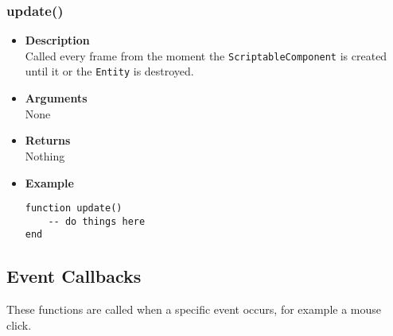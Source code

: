 \documentclass[12pt,a4paper]{article}
\begin{document}
\subsubsection{update()}
\begin{itemize}
	\item[]{\bf Description}
		\\ Called every frame from the moment the \texttt{ScriptableComponent} is created until it or the \texttt{Entity} is destroyed.
	\item[]{\bf Arguments}
		\\ None
	\item[]{\bf Returns}
		\\ Nothing
	\item[]{\bf Example}
\begin{lstlisting}[language={[5.0]Lua}]
function update()
	-- do things here
end
\end{lstlisting}
\end{itemize}


\subsection{Event Callbacks}

These functions are called when a specific event occurs, for example a mouse click.
\end{document}
